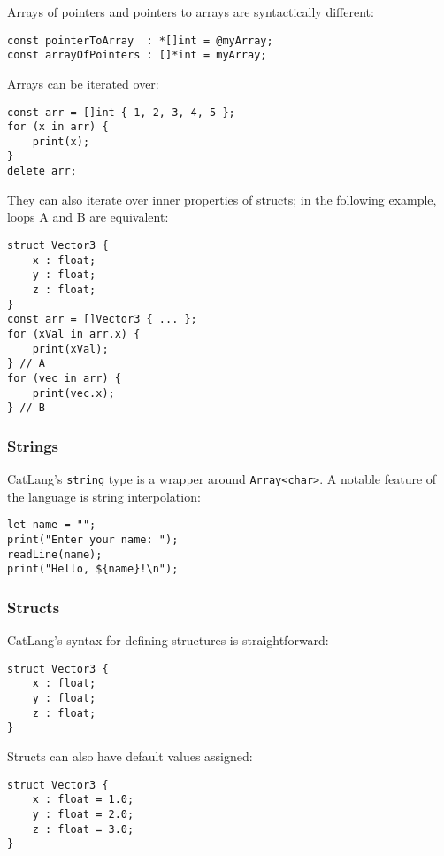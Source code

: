 \documentclass[12pt]{article}
\begin{document}
Arrays of pointers and pointers to arrays are syntactically different:

\begin{lstlisting}
const pointerToArray  : *[]int = @myArray;
const arrayOfPointers : []*int = myArray;
\end{lstlisting}

Arrays can be iterated over:

\begin{lstlisting}
const arr = []int { 1, 2, 3, 4, 5 };
for (x in arr) {
	print(x);
}
delete arr;
\end{lstlisting}

They can also iterate over inner properties of structs; in the following example, loops A and B are equivalent:

\begin{lstlisting}
struct Vector3 {
	x : float;
	y : float;
	z : float;
}
const arr = []Vector3 { ... };
for (xVal in arr.x) {
	print(xVal);
} // A
for (vec in arr) {
	print(vec.x);
} // B
\end{lstlisting}

\subsubsection{Strings}

CatLang's \lstinline!string! type is a wrapper around \lstinline!Array<char>!. A notable feature of the language is string interpolation:

\begin{lstlisting}
let name = "";
print("Enter your name: ");
readLine(name);
print("Hello, ${name}!\n");
\end{lstlisting}

\subsubsection{Structs}

CatLang's syntax for defining structures is straightforward:

\begin{lstlisting}
struct Vector3 {
	x : float;
	y : float;
	z : float;
}
\end{lstlisting}

Structs can also have default values assigned:

\begin{lstlisting}
struct Vector3 {
	x : float = 1.0;
	y : float = 2.0;
	z : float = 3.0;
}
\end{lstlisting}
\end{document}
